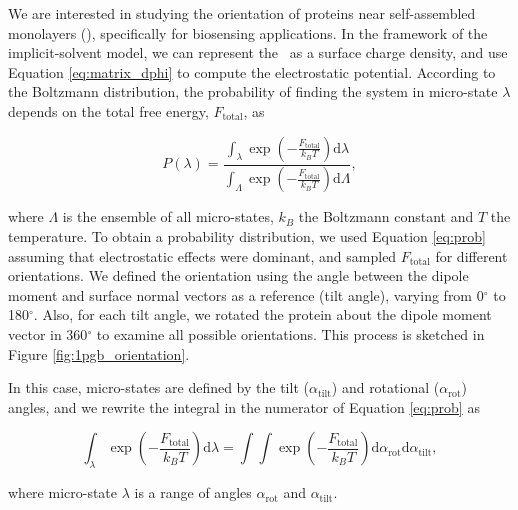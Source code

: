 
We are interested in studying the orientation of proteins near self-assembled monolayers (\sam), specifically for biosensing applications. In the framework of the implicit-solvent model, we can represent the \sam\ as a surface charge density, and use Equation \eqref{eq:matrix_dphi} to compute the electrostatic potential. 
According to the Boltzmann distribution, the probability of finding the system in micro-state $\lambda$ depends on the total free energy, $F_\text{total}$, as

\begin{equation} \label{eq:prob}
P(\lambda) = \frac{\int_{\lambda} \exp \left(-\frac{F_\text{total}}{k_B T} \right) \text{d} \lambda}{\int_{\Lambda} \exp \left(-\frac{F_\text{total}}{k_B T} \right) \text{d} \Lambda},
\end{equation} 

\noindent where $\Lambda$ is the ensemble of all micro-states, $k_B$ the Boltzmann constant and $T$ the temperature. To obtain a probability distribution, we used Equation \eqref{eq:prob} assuming that electrostatic effects were dominant, and sampled $F_\text{total}$ for different orientations. We defined the orientation using the angle between the dipole moment and surface normal vectors as a reference (tilt angle), varying from 0$^\circ$ to 180$^\circ$. Also, for each tilt angle, we rotated the protein about the dipole moment vector in 360$^\circ$ to examine all possible orientations. This process is sketched in Figure \ref{fig:1pgb_orientation}.

In this case, micro-states are defined by the tilt ($\alpha_{\text{tilt}}$) and rotational ($\alpha_{\text{rot}}$) angles, and we rewrite the integral in the numerator of Equation \eqref{eq:prob} as

\begin{equation} \label{eq:prob_angle}
\int_{\lambda} \exp \left(-\frac{F_\text{total}}{k_B T} \right) \text{d} \lambda = \int \int \exp \left(-\frac{F_\text{total}}{k_B T} \right) \text{d} \alpha_{\text{rot}} \text{d} \alpha_{\text{tilt}},
\end{equation}

\noindent where micro-state $\lambda$ is a range of angles $\alpha_{\text{rot}}$ and $\alpha_{\text{tilt}}$. 




